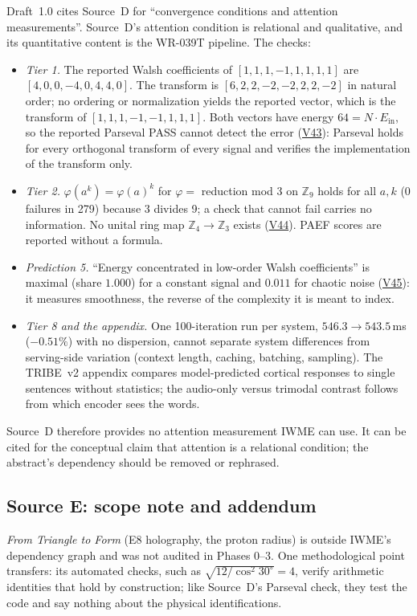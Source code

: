 \documentclass[11pt]{article}
\theoremstyle{definition}
\theoremstyle{remark}
\newcommand{\V}[1]{\hyperref[app:verify]{\textsf{#1}}}
\begin{document}
Draft~1.0 cites Source~D for ``convergence conditions and attention measurements''. Source~D's attention condition is relational and qualitative, and its quantitative content is the WR-039T pipeline. The checks:
\begin{itemize}
\item \emph{Tier 1.} The reported Walsh coefficients of $[1,1,1,-1,1,1,1,1]$ are $[4,0,0,-4,0,4,4,0]$. The transform is $[6,2,2,-2,-2,2,2,-2]$ in natural order; no ordering or normalization yields the reported vector, which is the transform of $[1,1,1,-1,-1,1,1,1]$. Both vectors have energy $64=N\cdot E_{\mathrm{in}}$, so the reported Parseval PASS cannot detect the error (\V{V43}): Parseval holds for every orthogonal transform of every signal and verifies the implementation of the transform only.
\item \emph{Tier 2.} $\varphi(a^k)=\varphi(a)^k$ for $\varphi=$ reduction mod 3 on $\mathbb Z_9$ holds for all $a,k$ (0 failures in 279) because 3 divides 9; a check that cannot fail carries no information. No unital ring map $\mathbb Z_4\to\mathbb Z_3$ exists (\V{V44}). PAEF scores are reported without a formula.
\item \emph{Prediction 5.} ``Energy concentrated in low-order Walsh coefficients'' is maximal (share $1.000$) for a constant signal and $0.011$ for chaotic noise (\V{V45}): it measures smoothness, the reverse of the complexity it is meant to index.
\item \emph{Tier 8 and the appendix.} One 100-iteration run per system, $546.3\to543.5$\,ms ($-0.51\%$) with no dispersion, cannot separate system differences from serving-side variation (context length, caching, batching, sampling). The TRIBE~v2 appendix compares model-predicted cortical responses to single sentences without statistics; the audio-only versus trimodal contrast follows from which encoder sees the words.
\end{itemize}
Source~D therefore provides no attention measurement IWME can use. It can be cited for the conceptual claim that attention is a relational condition; the abstract's dependency should be removed or rephrased.

\subsection{Source E: scope note and addendum}
\emph{From Triangle to Form} (E8 holography, the proton radius) is outside IWME's dependency graph and was not audited in Phases 0--3. One methodological point transfers: its automated checks, such as $\sqrt{12/\cos^2 30^\circ}=4$, verify arithmetic identities that hold by construction; like Source~D's Parseval check, they test the code and say nothing about the physical identifications.
\end{document}
